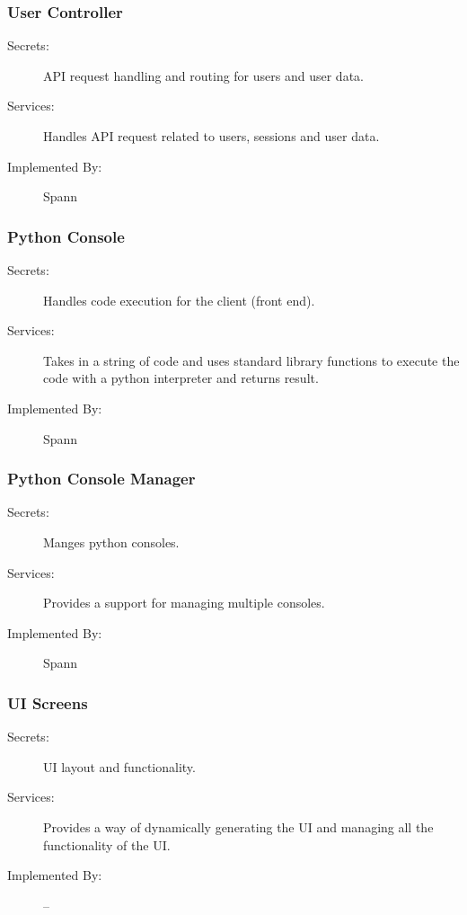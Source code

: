 \documentclass[12pt, titlepage]{article}
\begin{document}
\subsubsection{User Controller}

\begin{description}
\item[Secrets:] API request handling and routing for users and user data.
\item[Services:] Handles API request related to users, sessions and user data.
\item[Implemented By:] Spann
\end{description}



\subsubsection{Python Console}

\begin{description}
    \item[Secrets:] Handles code execution for the client (front end).
\item[Services:] Takes in a string of code and uses standard library functions
    to execute the code with a python interpreter and returns result.
\item[Implemented By:] Spann
\end{description}

\subsubsection{Python Console Manager}

\begin{description}
\item[Secrets:] Manges python consoles.
\item[Services:] Provides a support for managing multiple consoles.
\item[Implemented By:] Spann
\end{description}

\subsubsection{UI Screens}

\begin{description}
\item[Secrets:] UI layout and functionality.
\item[Services:] Provides a way of dynamically generating the UI and managing
    all the functionality of the UI.
\item[Implemented By:] --
\end{description}
\end{document}
